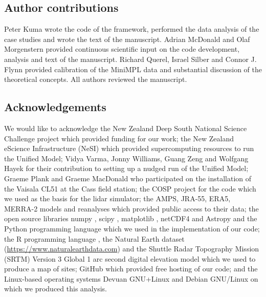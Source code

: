 \subsection*{Author contributions}

Peter Kuma wrote the code of the framework, performed the data analysis
of the case studies and wrote the text of the manuscript. Adrian McDonald and
Olaf Morgenstern provided continuous scientific input on the code development,
analysis and text of the manuscript. Richard Querel, Israel Silber and Connor
J. Flynn provided calibration of the MiniMPL data and substantial discussion
of the theoretical concepts. All authors reviewed the manuscript.

\subsection*{Acknowledgements}

We would like to acknowledge the New Zealand Deep South National Science Challenge
project which provided funding for our work; the New Zealand eScience
Infrastructure (NeSI) which provided supercomputing resources to run the Unified
Model; Vidya Varma, Jonny Williams, Guang Zeng and Wolfgang Hayek for their
contribution to setting up a nudged run of the Unified Model;
Graeme Plank and Graeme MacDonald who participated on the installation of
the Vaisala CL51 at the Cass field station; the COSP project for the code which
we used as the basis for the lidar simulator; the AMPS, JRA-55, ERA5, MERRA-2
models and reanalyses which provided public access to their data; the open source libraries numpy \citep{derwalt2011}, scipy \citep{scipy2019}, matplotlib \citep{hunter2007}, netCDF4 \citep{rew1990} and Astropy \citep{astropy2018} and the
Python programming language \citep{rossum1995} which we used in the
implementation of our code; the R programming language \citep{r2017}, the Natural Earth
dataset (\url{https://www.naturalearthdata.com}) and the Shuttle Radar Topography Mission (SRTM) Version 3 Global 1 arc second digital elevation model \citep{werner2001,srtm}
which we used to produce a map of sites; GitHub which provided free hosting
of our code; and the Linux-based \citep{torvalds1997} operating systems
Devuan GNU+Linux and Debian GNU/Linux on which we produced this analysis.

\normalfont
\normalsize
